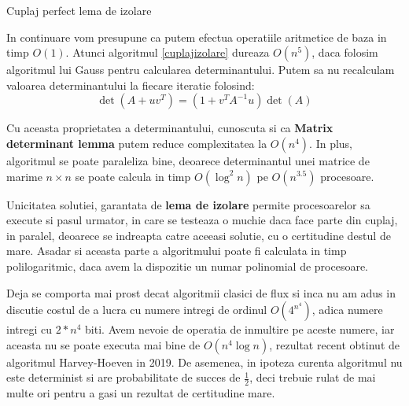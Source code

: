 \vspace{5 mm}

\begin{algorithm}[H]
 \label{cuplajizolare}
 \caption{Cuplaj perfect lema de izolare}
\end{algorithm}

\pagebreak

In continuare vom presupune ca putem efectua operatiile aritmetice de baza in timp $O(1)$.
Atunci algoritmul \ref{cuplajizolare} dureaza $O(n^{5})$, daca folosim
algoritmul lui Gauss pentru calcularea determinantului. Putem sa nu recalculam
valoarea determinantului la fiecare iteratie folosind:
\begin{equation}
  \det(A + uv^{T}) = (1 + v^{T} A^{-1} u) \det(A)
\end{equation}

Cu aceasta proprietatea a determinantului, cunoscuta si ca \textbf{Matrix
  determinant lemma} putem reduce complexitatea la $O(n^{4})$. In plus,
algoritmul se poate paraleliza bine, deoarece determinantul unei matrice
de marime $n \times n$ se poate calcula in timp $O(\log^{2}n)$ pe $O(n^{3.5})$ procesoare.

Unicitatea solutiei, garantata de \textbf{lema de izolare} permite procesoarelor
sa execute si pasul urmator, in care se testeaza o muchie daca face parte din
cuplaj, in paralel, deoarece se indreapta catre aceeasi solutie, cu o
certitudine destul de mare. Asadar si aceasta parte a algoritmului poate fi
calculata in timp polilogaritmic, daca avem la dispozitie un numar polinomial de
procesoare.

Deja se comporta mai prost decat algoritmii clasici de flux si inca nu am adus in discutie costul de
a lucra cu numere intregi de ordinul $O(4^{n^{4}})$, adica numere intregi cu
$2 * n^{4}$ biti. Avem nevoie de operatia de inmultire pe aceste numere, iar
aceasta nu se poate executa mai bine de $O(n^{4}\log n)$, rezultat recent
obtinut de algoritmul Harvey-Hoeven in 2019.
De asemenea, in ipoteza curenta algoritmul nu este determinist si
are probabilitate de succes de $\frac{1}{2}$, deci trebuie rulat de mai multe
ori pentru a gasi un rezultat de certitudine mare.

